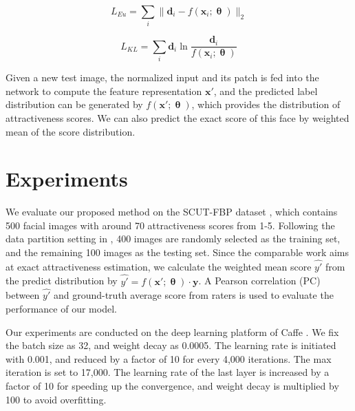 \documentclass[preprint,5p,times,twocolumn]{elsarticle}
\begin{document}
\begin{equation}
\label{eq1}
L_{Eu}=\sum_{i}{\lVert{\mathbf{d}_i-f(\mathbf{x}_i;\boldsymbol{\uptheta})}\lVert_2}
\end{equation}

\begin{equation}
\label{eq2}
L_{KL}=\sum_{i}{\mathbf{d}_i\ln{\frac{\mathbf{d}_i}{f(\mathbf{x}_i;\boldsymbol{\uptheta})}}}
\end{equation}

Given a new test image, the normalized input and its patch is fed into the network to compute the feature representation $\mathbf{x'}$, and the predicted label distribution can be generated by $f(\mathbf{x'};\boldsymbol{\uptheta})$, which provides the distribution of attractiveness scores. We can also predict the exact score of this face by weighted mean of the score distribution.





\section{Experiments}
We evaluate our proposed method on the SCUT-FBP dataset \cite{SMC15_Xie}, which contains 500 facial images with around 70 attractiveness scores from 1-5. Following the data partition setting in \cite{arXiv15_Xu}, 400 images are randomly selected as the training set, and the remaining 100 images as the testing set. Since the comparable work aims at exact attractiveness estimation, we calculate the weighted mean score $\hat{y'}$ from the predict distribution by $\hat{y'}=f(\mathbf{x'};\boldsymbol{\uptheta})\cdot\mathbf{y}$. A Pearson correlation (PC) between $\hat{y'}$ and ground-truth average score from raters is used to evaluate the performance of our model.

Our experiments are conducted on the deep learning platform of Caffe \cite{ACMM14_Caffe}. We fix the batch size as 32, and weight decay as 0.0005. The learning rate is initiated with 0.001, and reduced by a factor of 10 for every 4,000 iterations. The max iteration is set to 17,000. The learning rate of the last layer is increased by a factor of 10 for speeding up the convergence, and weight decay is multiplied by 100 to avoid overfitting.
\end{document}
